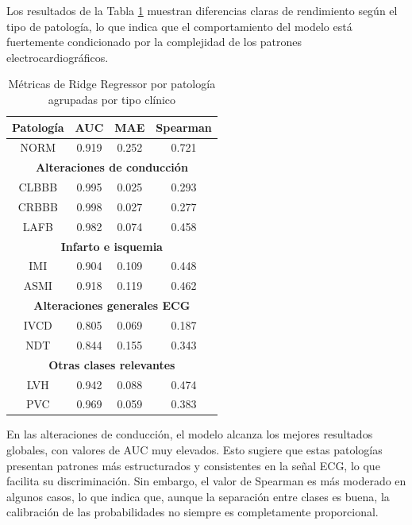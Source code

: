 \documentclass[12pt,a4paper,twoside]{book}
\begin{document}
Los resultados de la Tabla \ref{tab:metrics_grouped_rr} muestran diferencias claras de rendimiento según el tipo de patología, lo que indica que el comportamiento del modelo está fuertemente condicionado por la complejidad de los patrones electrocardiográficos.

\begin{table}[H]
	\centering
	\begin{tabular}{|c|c|c|c|}
	\hline
	\textbf{Patología} & \textbf{AUC} & \textbf{MAE} & \textbf{Spearman} \\
	\hline

	NORM & 0.919 & 0.252 & 0.721 \\
	\hline

	\multicolumn{4}{|c|}{\textbf{Alteraciones de conducción}} \\\hline
	CLBBB & 0.995 & 0.025 & 0.293 \\ 
	CRBBB & 0.998 & 0.027 & 0.277 \\ 
	LAFB  & 0.982 & 0.074 & 0.458 \\
	\hline

	\multicolumn{4}{|c|}{\textbf{Infarto e isquemia}}\\ \hline
	IMI   & 0.904 & 0.109 & 0.448 \\ 
	ASMI  & 0.918 & 0.119 & 0.462 \\ 
	\hline

	\multicolumn{4}{|c|}{\textbf{Alteraciones generales ECG}} \\ \hline
	IVCD  & 0.805 & 0.069 & 0.187 \\
	NDT   & 0.844 & 0.155 & 0.343 \\ 
	\hline

	\multicolumn{4}{|c|}{\textbf{Otras clases relevantes}}  \\ \hline
	LVH   & 0.942 & 0.088 & 0.474 \\
	PVC   & 0.969 & 0.059 & 0.383 \\
	\hline

	\end{tabular}
	\caption{Métricas de Ridge Regressor por patología agrupadas por tipo clínico}
	\label{tab:metrics_grouped_rr}
\end{table}

En las alteraciones de conducción, el modelo alcanza los mejores resultados globales, con valores de AUC muy elevados. 
Esto sugiere que estas patologías presentan patrones más estructurados y consistentes en la señal ECG, lo que facilita su discriminación. 
Sin embargo, el valor de Spearman es más moderado en algunos casos, lo que indica que, aunque la separación entre clases es buena, la calibración de las probabilidades no siempre es completamente proporcional.
\end{document}
